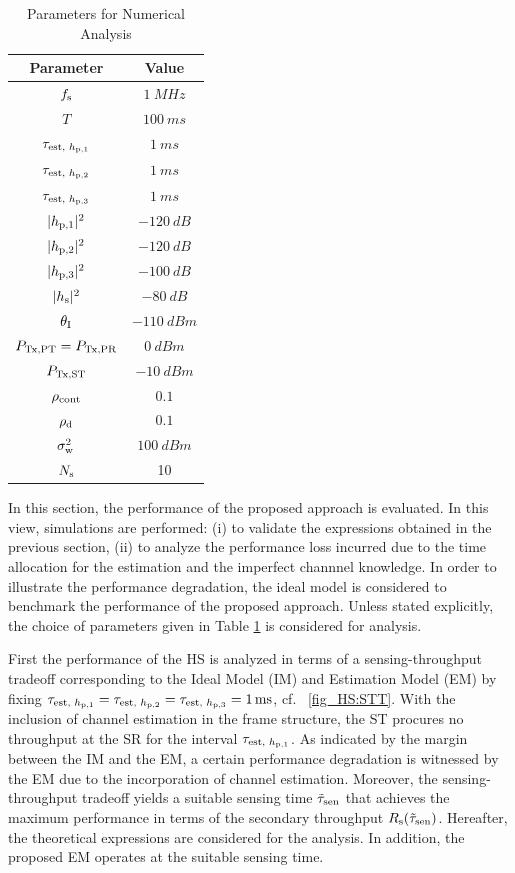 \begin{table}
\renewcommand{\arraystretch}{1.4}
\caption{Parameters for Numerical Analysis}
\label{tb_HS:tb2}
\centering
\begin{tabular}{c||c}
\hline
\bfseries Parameter & \bfseries Value \\
\hline\hline
$f_{\text{s}}$ & $\SI{1}{MHz}$ \\ 
$T$ & $\SI{100}{ms}$ \\ 
$\tau_{\text{est, $h_{\text{p,1}}$}}$ & $\SI{1}{ms}$ \\
$\tau_{\text{est, $h_{\text{p,2}}$}}$ & $\SI{1}{ms}$ \\
$\tau_{\text{est, $h_{\text{p,3}}$}}$ & $\SI{1}{ms}$ \\
$|h_{\text{p,1}}|^2$ & $\SI{-120}{dB}$ \\ 
$|h_{\text{p,2}}|^2$ & $\SI{-120}{dB}$ \\ 
$|h_{\text{p,3}}|^2$ & $\SI{-100}{dB}$ \\ 
$|h_{\text{s}}|^2$ & $\SI{-80}{dB}$ \\ 
$\theta_{\text{I}}$ & $\SI{-110}{dBm}$ \\ 
$P_{\text{Tx,PT}} = P_{\text{Tx,PR}}$ & $\SI{0}{dBm}$ \\ 
$P_{\text{Tx,ST}}$ & $\SI{-10}{dBm}$ \\ 
$\rho_{\text{cont}}$ & $0.1$ \\
$\rho_{\text{d}}$ & $0.1$ \\
$\sigma^2_{\text{w}}$ & $\SI{100}{dBm}$ \\
$N_{\text{s}}$ & 10 \\ \hline
\end{tabular}
\end{table}

In this section, the performance of the proposed approach is evaluated. In this view, simulations are performed: (i) to validate the expressions obtained in the previous section, (ii) to analyze the performance loss incurred due to the time allocation for the estimation and the imperfect channnel knowledge. In order to illustrate the performance degradation, the ideal model is considered to benchmark the performance of the proposed approach. Unless stated explicitly, the choice of parameters given in Table \ref{tb_HS:tb2} is considered for analysis. 

First the performance of the HS is analyzed in terms of a sensing-throughput tradeoff corresponding to the Ideal Model (IM) and Estimation Model (EM) by fixing $\tau_{\text{est, $h_{\text{p,1}}$}} = \tau_{\text{est, $h_{\text{p,2}}$}} =  \tau_{\text{est, $h_{\text{p,3}}$}} = \SI{1}{ms}$, cf. \figurename~\ref{fig_HS:STT}. With the inclusion of channel estimation in the frame structure, the ST procures no throughput at the SR for the interval $\tau_{\text{est, $h_{\text{p,1}}$}}$. As indicated by the margin between the IM and the EM, a certain performance degradation is witnessed by the EM due to the incorporation of channel estimation. Moreover, the sensing-throughput tradeoff yields a suitable sensing time $\tilde{\tau}_{\text{sen}}$ that achieves the maximum performance in terms of the secondary throughput $R_{\text{s}}(\tilde{\tau}_{\text{sen}})$. Hereafter, the theoretical expressions are considered for the analysis. In addition, the proposed EM operates at the suitable sensing time. 


